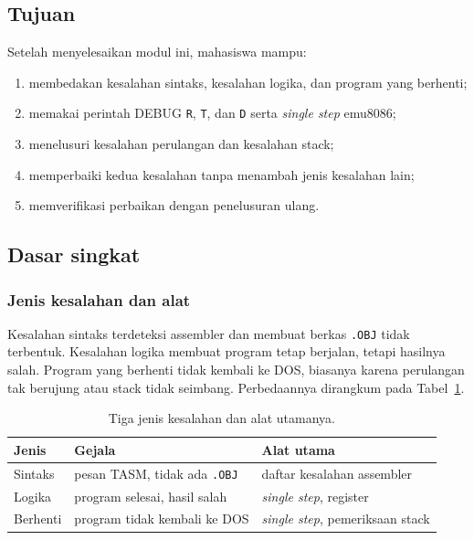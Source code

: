 
\subsection{Tujuan}

\begin{tujuan}
Setelah menyelesaikan modul ini, mahasiswa mampu:
\begin{enumerate}
    \item membedakan kesalahan sintaks, kesalahan logika, dan program
          yang berhenti;
    \item memakai perintah DEBUG \texttt{R}, \texttt{T}, dan
          \texttt{D} serta \emph{single step} emu8086;
    \item menelusuri kesalahan perulangan dan kesalahan stack;
    \item memperbaiki kedua kesalahan tanpa menambah jenis kesalahan
          lain;
    \item memverifikasi perbaikan dengan penelusuran ulang.
\end{enumerate}
\end{tujuan}

\subsection{Dasar singkat}

\subsubsection*{Jenis kesalahan dan alat}

Kesalahan sintaks terdeteksi assembler dan membuat berkas
\texttt{.OBJ} tidak terbentuk. Kesalahan logika membuat program tetap
berjalan, tetapi hasilnya salah. Program yang berhenti tidak kembali
ke DOS, biasanya karena perulangan tak berujung atau stack tidak
seimbang. Perbedaannya dirangkum pada Tabel~\ref{tab:m11-jenis}.

\begin{table}[H]
    \centering
    \caption{Tiga jenis kesalahan dan alat utamanya.}
    \label{tab:m11-jenis}
    \small
    \begin{tabular}{@{}lll@{}}
        \toprule
        \textbf{Jenis} & \textbf{Gejala} & \textbf{Alat utama} \\
        \midrule
        Sintaks & pesan TASM, tidak ada \texttt{.OBJ} &
        daftar kesalahan assembler \\
        Logika & program selesai, hasil salah &
        \emph{single step}, register \\
        Berhenti & program tidak kembali ke DOS &
        \emph{single step}, pemeriksaan stack \\
        \bottomrule
    \end{tabular}
\end{table}


